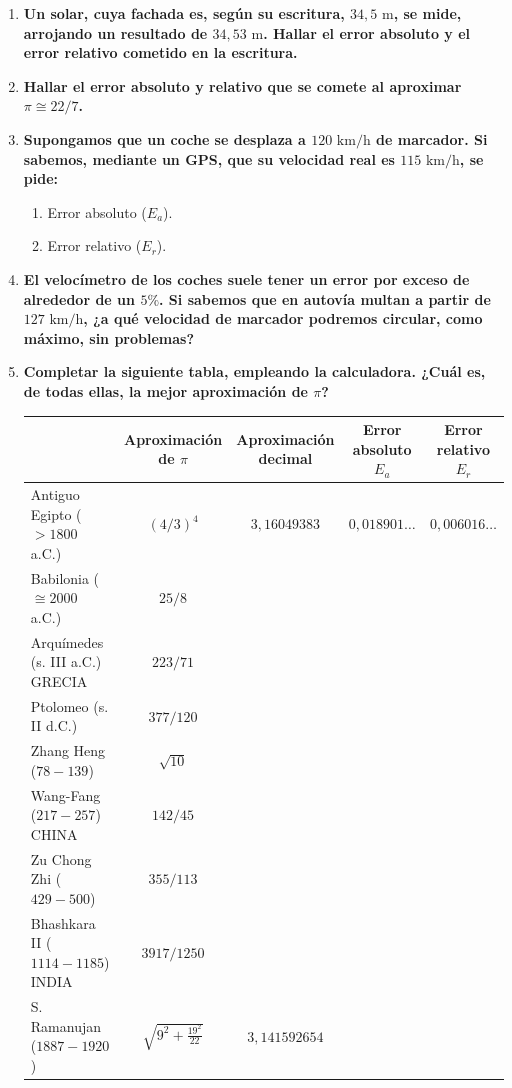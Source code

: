\documentclass[10pt, a4paper]{article}
\begin{document}
\begin{enumerate}
    \item \textbf{Un solar, cuya fachada es, según su escritura, $34{,}5\text{ m}$, se mide, arrojando un resultado de $34{,}53\text{ m}$. Hallar el error absoluto y el error relativo cometido en la escritura.}

    \item \textbf{Hallar el error absoluto y relativo que se comete al aproximar $\pi \cong 22/7$.}

    \item \textbf{Supongamos que un coche se desplaza a $120\text{ km/h}$ de marcador. Si sabemos, mediante un GPS, que su velocidad real es $115\text{ km/h}$, se pide:}
    \begin{enumerate}[label=\alph*)]
        \item Error absoluto ($E_a$).
        \item Error relativo ($E_r$).
    \end{enumerate}

    \item \textbf{El velocímetro de los coches suele tener un error por exceso de alrededor de un $5\%$. Si sabemos que en autovía multan a partir de $127\text{ km/h}$, ¿a qué velocidad de marcador podremos circular, como máximo, sin problemas?}

    \item \textbf{Completar la siguiente tabla, empleando la calculadora. ¿Cuál es, de todas ellas, la mejor aproximación de $\pi$?}

    \begin{center}
    \small
    \begin{tabularx}{\textwidth}{|X|c|c|c|c|}
    \hline
    & \textbf{Aproximación de $\pi$} & \textbf{Aproximación decimal} & \textbf{Error absoluto $E_a$} & \textbf{Error relativo $E_r$} \\ \hline
    Antiguo Egipto ($>1800$ a.C.) & $(4/3)^4$ & $3{,}16049383$ & $0{,}018901\dots$ & $0{,}006016\dots$ \\ \hline
    Babilonia ($\cong 2000$ a.C.) & $25/8$ & & & \\ \hline
    Arquímedes (s. III a.C.) GRECIA & $223/71$ & & & \\ \hline
    Ptolomeo (s. II d.C.) & $377/120$ & & & \\ \hline
    Zhang Heng ($78-139$) & $\sqrt{10}$ & & & \\ \hline
    Wang-Fang ($217-257$) CHINA & $142/45$ & & & \\ \hline
    Zu Chong Zhi ($429-500$) & $355/113$ & & & \\ \hline
    Bhashkara II ($1114-1185$) INDIA & $3917/1250$ & & & \\ \hline
    S. Ramanujan ($1887-1920$) & $\sqrt{9^2 + \frac{19^2}{22}}$ & $3{,}141592654$ & & \\ \hline
    \end{tabularx}
    \end{center}


\end{enumerate}
\end{document}
